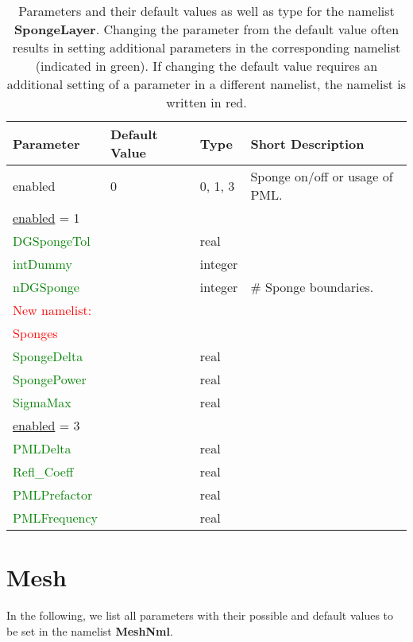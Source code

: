 \documentclass[12pt,twoside]{article}
\begin{document}
\begin{table}[H]
\caption{Parameters and their default values as well as type for the namelist \textbf{SpongeLayer}.
         Changing the parameter from the default value often results in setting additional parameters
         in the corresponding namelist (indicated in green).
         If changing the default value requires an additional setting of a parameter in a different namelist,
         the namelist is written in red.}
\begin{center}
\begin{tabular}{|p{4cm}|p{2.7cm}|p{2cm}|p{4cm}|}
\hline
Parameter & Default Value & Type & Short Description \\
\hline
\hline
enabled & 0 & 0, 1, 3 & Sponge on/off or usage of PML.\\
\hdashline
\uline{enabled} = 1 & & &\\
\textcolor{green}{DGSpongeTol} &  & real & \\
\textcolor{green}{intDummy} &  & integer & \\
\textcolor{green}{nDGSponge} &  & integer & \# Sponge boundaries.\\
\textcolor{red}{New namelist:} & & &\\
\textcolor{red}{Sponges} & & &\\
\textcolor{green}{SpongeDelta} &  & real & \\
\textcolor{green}{SpongePower} &  & real & \\
\textcolor{green}{SigmaMax} &  & real & \\
\hdashline
\uline{enabled} = 3 & & &\\
\textcolor{green}{PMLDelta} & & real &\\
\textcolor{green}{Refl\_Coeff} &  & real & \\
\textcolor{green}{PMLPrefactor} &  & real & \\
\textcolor{green}{PMLFrequency} &  & real & \\
\hline
\end{tabular}
\end{center}
\label{sponge-table}
\end{table}


\newpage

\section{Mesh}
\label{sec-block-msh}

In the following, we list all parameters with their possible and default values to be set in the namelist \textbf{MeshNml}.\\
\end{document}
